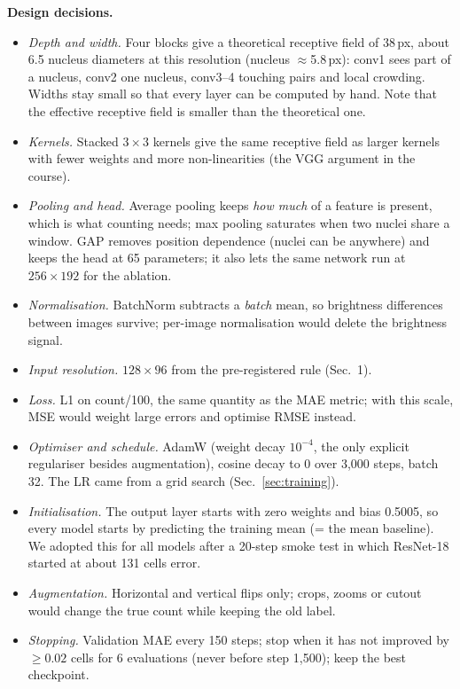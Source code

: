 \documentclass[11pt,a4paper]{article}
\begin{document}
\textbf{Design decisions.}
\begin{itemize}\setlength\itemsep{1pt}
\item \emph{Depth and width.} Four blocks give a theoretical receptive field of 38\,px, about 6.5
nucleus diameters at this resolution (nucleus $\approx$5.8\,px): conv1 sees part of a nucleus,
conv2 one nucleus, conv3--4 touching pairs and local crowding. Widths stay small so that every layer
can be computed by hand. Note that the effective receptive field is smaller than the theoretical one.
\item \emph{Kernels.} Stacked $3\times3$ kernels give the same receptive field as larger kernels with
fewer weights and more non-linearities (the VGG argument in the course).
\item \emph{Pooling and head.} Average pooling keeps \emph{how much} of a feature is present, which is
what counting needs; max pooling saturates when two nuclei share a window. GAP removes position
dependence (nuclei can be anywhere) and keeps the head at 65 parameters; it also lets the same
network run at $256\times192$ for the ablation.
\item \emph{Normalisation.} BatchNorm subtracts a \emph{batch} mean, so brightness differences
between images survive; per-image normalisation would delete the brightness signal.
\item \emph{Input resolution.} $128\times96$ from the pre-registered rule (Sec.~1).
\item \emph{Loss.} L1 on count/100, the same quantity as the MAE metric; with this scale, MSE would
weight large errors and optimise RMSE instead.
\item \emph{Optimiser and schedule.} AdamW (weight decay $10^{-4}$, the only explicit regulariser
besides augmentation), cosine decay to 0 over 3{,}000 steps, batch 32. The LR came from a grid search
(Sec.~\ref{sec:training}).
\item \emph{Initialisation.} The output layer starts with zero weights and bias 0.5005, so every model
starts by predicting the training mean (= the mean baseline). We adopted this for all models after a
20-step smoke test in which ResNet-18 started at about 131 cells error.
\item \emph{Augmentation.} Horizontal and vertical flips only; crops, zooms or cutout would change the
true count while keeping the old label.
\item \emph{Stopping.} Validation MAE every 150 steps; stop when it has not improved by $\geq0.02$
cells for 6 evaluations (never before step 1{,}500); keep the best checkpoint.
\end{itemize}
\end{document}
